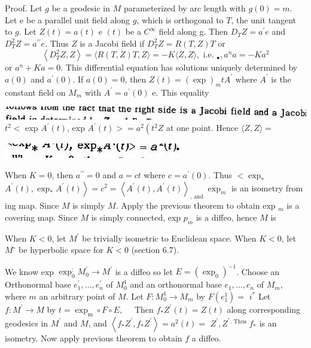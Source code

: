 \documentclass[10pt]{article}
\begin{document}
Proof. Let $g$ be a geodesic in $M$ parameterized by arc length with $g(0)=m .$ Let e be a parallel unit field along $g$, which is orthogonal to $T$, the unit tangent to $g$. Let $Z(t)=a(t)$ e $(t)$ be a $C^{\infty}$ field along g. Then $D_{T} Z=a^{\prime} e$ and $D_{T}^{2} Z=a^{\prime \prime} e .$ Thus $Z$ is a Jacobi field if $D_{T}^{2} Z=R(T, Z) T$ or
$$
\left\langle D_{T}^{2} Z, Z\right\rangle=\langle R(T, Z) T, Z\rangle=-K\langle Z, Z\rangle, \text { i.e. }_{\bullet}, a^{n} a=-K a^{2}
$$
or $a^{n}+K a=0$. This differential equation has solutions uniquely determined by $a(0)$ and $a^{\prime}(0)$. If $a(0)=0$, then $Z(t)=(\exp )_{m} t A^{\prime}$ where $A^{\prime}$ is the constant field on $M_{m}$ with $A^{\prime}=a^{\prime}(0)$ e. This equality

\includegraphics[max width=\textwidth]{2022_07_16_f4e476ee2159dc67e746g-88}\\
$t^{2}<$ exp $A^{\prime}(t)$, exp $A^{\prime}(t)>=a^{2}\left(t^{2} Z\right.$ at one point. Hence $\langle Z, Z\rangle=$

\includegraphics[max width=\textwidth]{2022_07_16_f4e476ee2159dc67e746g-88(1)}

When $K=0$, then $a^{\prime \prime}=0$ and $a=c t$ where $c=a^{\prime}(0) .$ Thus $<\exp _{*}$ $\left.A^{\prime}(t), \exp _{*} A^{\prime}(t)\right\rangle=c^{2}=\left\langle A^{\prime}(t), A^{\prime}(t)\right\rangle_{\text {, and }} \exp _{m}$ is an isometry from ing map. Since $M$ is simply $M$. Apply the previous theorem to obtain exp ${ }_{m}$ is a covering map. Since $M$ is simply connected, exp $p_{m}$ is a diffeo, hence $M$ is

When $K<0$, let $M^{\prime}$ be trivially isometric to Euclidean space. When $K<0$, let $M^{\circ}$ be hyperbolic space for $K<0$ (section 6.7).

We know exp $\exp _{0}^{:} M_{0}^{\prime} \rightarrow M^{\prime}$ is a diffeo so let $E=\left(\exp _{0}\right)^{-1}$. Choose an Orthonormal base $e_{1}^{\prime}, \ldots, e_{n}^{\prime}$ of $M_{0}^{1}$ and an orthonormal base $e_{1}, \ldots, e_{n}$ of $M_{m}$, where $m$ an arbitrary point of $M .$ Let $F: M_{0}^{1} \rightarrow M_{m}$ by $F\left(e_{1}^{1}\right)=$ $i^{*}$ Let $f: M^{\prime} \rightarrow M$ by $t=\exp _{\mathrm{m}} \circ F \circ E, \quad$ Then $f_{*} Z^{\prime}(t)=Z(t)$ along corresponding geodesics in $M^{\prime}$ and $M$, and $\left\langle f_{*} Z^{\prime}, f_{*} Z^{\prime}\right\rangle=a^{2}(t)=$ $Z^{\prime}, Z^{\prime}{ }^{\text {. Thus }} f_{*}$ is an isometry. Now apply previous theorem to obtain $f$ a diffeo.
\end{document}
